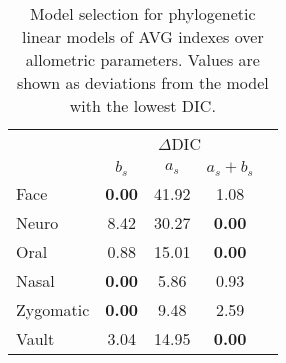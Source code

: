 \begin{table}[ht]
  \centering
  \caption{Model selection for phylogenetic linear models of AVG indexes over allometric parameters. Values are shown as deviations from the model with the lowest DIC. \label{tab:dic_allo_im}}
  \begin{tabular}{lcccc}
    \hline
    & \multicolumn{3}{c}{\small{$\Delta$DIC}} \\
    & $b_s$ & $a_s$ & $a_s + b_s$ \\ 
    \hline
    Face & {\bf 0.00} & 41.92 & 1.08 \\ 
    Neuro & 8.42 & 30.27 & {\bf 0.00} \\ 
    Oral & 0.88 & 15.01 & {\bf 0.00} \\ 
    Nasal & {\bf 0.00} & 5.86 & 0.93 \\ 
    Zygomatic & {\bf 0.00} & 9.48 & 2.59 \\ 
    Vault & 3.04 & 14.95 & {\bf 0.00} \\ 
    \hline
  \end{tabular}
\end{table}